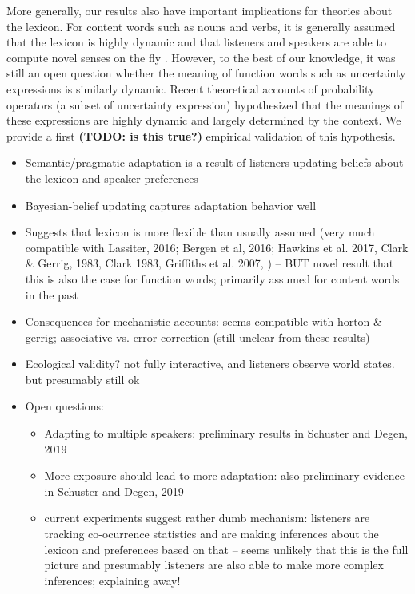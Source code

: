 \documentclass[lucida,biblatex]{sp} %
\newcommand{\todo}[1]{}
\renewcommand{\todo}[1]{{\bf \color{red} (TODO: {#1})}}
\begin{document}
More generally, our results also have important implications for theories about the lexicon. For content words such as nouns and verbs, it is generally assumed that 
the lexicon is highly dynamic and that listeners and speakers are able to compute novel senses on the fly \cite[e.g.,][]{Clark1983,ClarkGerrig1983,Griffiths2007?}. 
However, to the best of our knowledge, it was still an open question whether the meaning of function words such as uncertainty expressions is similarly dynamic.
Recent theoretical accounts of probability operators (a subset of uncertainty expression) \cite[e.g.,][]{Yalcin2010,Lassiter2016} hypothesized that the meanings of 
these expressions are highly dynamic and largely determined by the context. We provide a first \todo{is this true?} empirical validation of this hypothesis.





\begin{itemize}
\item Semantic/pragmatic adaptation is a result of listeners updating beliefs about the lexicon and speaker preferences
\item Bayesian-belief updating captures adaptation behavior well
\item Suggests that lexicon is more flexible than usually assumed (very much compatible with Lassiter, 2016; Bergen et al, 2016; Hawkins et al. 2017, Clark \& Gerrig, 1983, Clark 1983, Griffiths et al. 2007, ) -- BUT novel result that this is also the case for function words; primarily assumed for content words in the past


\item Consequences for mechanistic accounts: seems compatible with horton \& gerrig; associative vs. error correction (still unclear from these results)
\item Ecological validity? not fully interactive, and listeners observe world states. but presumably still ok
\item Open questions:
\begin{itemize}
\item Adapting to multiple speakers: preliminary results in Schuster and Degen, 2019
\item More exposure should lead to more adaptation: also preliminary evidence in Schuster and Degen, 2019
\item current experiments suggest rather dumb mechanism: listeners are tracking co-ocurrence statistics and 
are making inferences about the lexicon and preferences based on that -- seems unlikely that this is the full picture and
presumably listeners are also able to make more complex inferences; explaining away!
\end{itemize}
\end{itemize}
\end{document}
